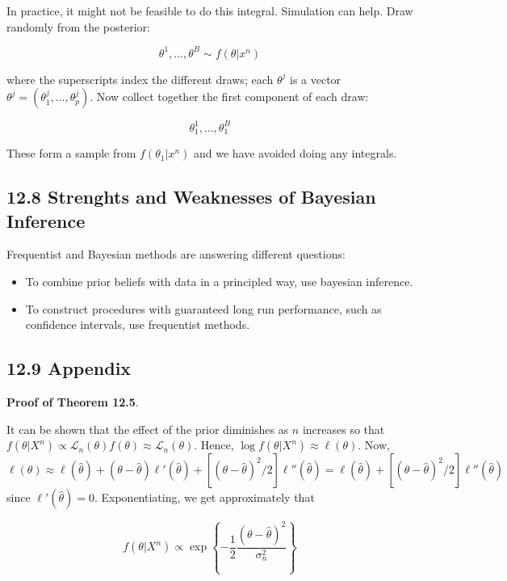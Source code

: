 In practice, it might not be feasible to do this integral. Simulation
can help. Draw randomly from the posterior:

\[\theta^{1}, \dots, \theta^B \sim f(\theta | x^{n})\]

where the superscripts index the different draws; each \(\theta^{j}\) is a
vector \(\theta^{j} = (\theta^{j}_{1}, \dots, \theta^{j}_p)\). Now collect
together the first component of each draw:

\[\theta^{1}_{1}, \dots, \theta^B_{1}\]

These form a sample from \(f(\theta_{1} | x^{n})\) and we have avoided doing
any integrals.

\subsection*{12.8 Strenghts and Weaknesses of Bayesian
Inference}\label{strenghts-and-weaknesses-of-bayesian-inference}

Frequentist and Bayesian methods are answering different questions:

\begin{itemize}[tightlist]
\item
  To combine prior beliefs with data in a principled way, use bayesian
  inference.
\item
  To construct procedures with guaranteed long run performance, such as
  confidence intervals, use frequentist methods.
\end{itemize}

\subsection*{12.9 Appendix}\label{appendix:bayesian}

\textbf{Proof of Theorem 12.5}.

It can be shown that the effect of the prior diminishes as \(n\)
increases so that
\(f(\theta | X^{n}) \propto \mathcal{L}_{n}(\theta)f(\theta) \approx \mathcal{L}_{n}(\theta)\).
Hence, \(\log f(\theta | X^{n}) \approx \ell(\theta)\). Now,
\(\ell(\theta) \approx \ell(\hat{\theta}) + (\theta - \hat{\theta})\ell'(\hat{\theta}) + [(\theta - \hat{\theta})^{2}/2]\ell''(\hat{\theta}) = \ell(\hat{\theta}) + [(\theta - \hat{\theta})^{2}/2] \ell''(\hat{\theta})\)
since \(\ell'(\hat{\theta}) = 0\). Exponentiating, we get approximately
that

\[ f(\theta | X^{n}) \propto \exp \left\{ - \frac{1}{2} \frac{(\theta - \hat{\theta})^{2}}{\sigma_{n}^{2}} \right\} \]

